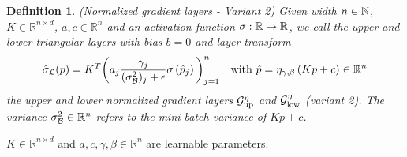 \documentclass[twoside,a4paper]{article}
\newtheorem{definition}{Definition}
\begin{document}
\begin{definition}
	(Normalized gradient layers - Variant 2)
	Given width $n \in \mathbb{N}$, $K \in \mathbb{R}^{n \times d}$, $a,c \in \mathbb{R}^n$ and
	an activation function $\sigma : \mathbb{R} \to \mathbb{R}$,
	we call the upper and lower triangular layers with bias $b=0$ and layer transform
	\begin{equation*}
		\hat{\sigma}_{\mathcal{L}}(p) = K^T \bigg( a_j \frac{\gamma_j}{(\sigma^2_\mathcal{B})_j + \epsilon}
		\sigma \left( \hat{p}_j \right) \bigg)_{j=1}^n
		\quad \text{with } \hat{p} = \eta_{\gamma, \beta} \left( Kp + c \right) \in \mathbb{R}^n
	\end{equation*}
	the upper and lower normalized gradient layers 
	$\mathcal{G}_{\text{up}}^{\eta}$ and $\mathcal{G}_{\text{low}}^{\eta}$ (variant 2).
	The variance $\sigma^2_\mathcal{B} \in \mathbb{R}^n$ refers to the mini-batch variance of $Kp+c$.
\end{definition}

$K \in \mathbb{R}^{n \times d}$ and $a,c, \gamma, \beta \in \mathbb{R}^n$
are learnable parameters.



\end{document}
